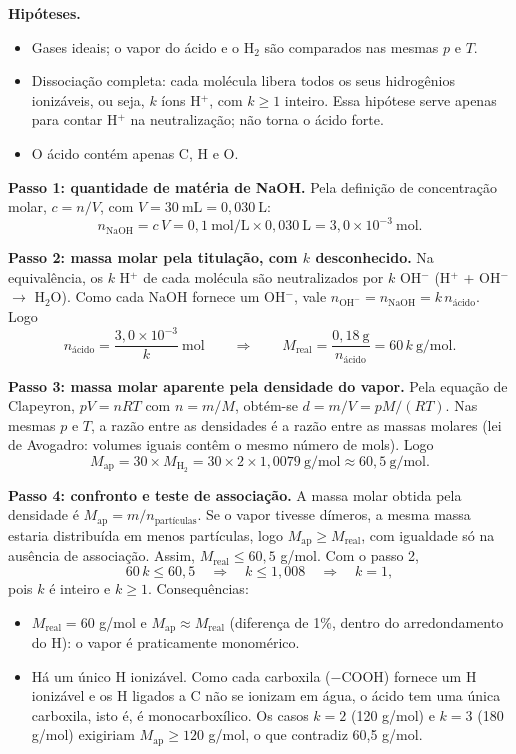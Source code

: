 \documentclass{article}%
\begin{document}
\textbf{Hipóteses.}
\begin{itemize}
\item Gases ideais; o vapor do ácido e o H$_2$ são comparados nas mesmas $p$ e $T$.
\item Dissociação completa: cada molécula libera todos os seus hidrogênios ionizáveis, ou seja, $k$ íons H$^+$, com $k \geq 1$ inteiro. Essa hipótese serve apenas para contar H$^+$ na neutralização; não torna o ácido forte.
\item O ácido contém apenas C, H e O.
\end{itemize}

\textbf{Passo 1: quantidade de matéria de NaOH.} Pela definição de concentração molar, $c = n/V$, com $V = 30\ \text{mL} = 0{,}030\ \text{L}$:
\[
n_{\text{NaOH}} = c\,V = 0{,}1\ \text{mol/L} \times 0{,}030\ \text{L} = 3{,}0 \times 10^{-3}\ \text{mol}.
\]

\textbf{Passo 2: massa molar pela titulação, com $k$ desconhecido.} Na equivalência, os $k$ H$^+$ de cada molécula são neutralizados por $k$ OH$^-$ (H$^+$ + OH$^-$ $\rightarrow$ H$_2$O). Como cada NaOH fornece um OH$^-$, vale $n_{\text{OH}^-} = n_{\text{NaOH}} = k\,n_{\text{ácido}}$. Logo
\[
n_{\text{ácido}} = \frac{3{,}0 \times 10^{-3}}{k}\ \text{mol}
\qquad\Rightarrow\qquad
M_{\text{real}} = \frac{0{,}18\ \text{g}}{n_{\text{ácido}}} = 60\,k\ \text{g/mol}.
\]

\textbf{Passo 3: massa molar aparente pela densidade do vapor.} Pela equação de Clapeyron, $pV = nRT$ com $n = m/M$, obtém-se $d = m/V = pM/(RT)$. Nas mesmas $p$ e $T$, a razão entre as densidades é a razão entre as massas molares (lei de Avogadro: volumes iguais contêm o mesmo número de mols). Logo
\[
M_{\text{ap}} = 30 \times M_{\text{H}_2} = 30 \times 2 \times 1{,}0079\ \text{g/mol} \approx 60{,}5\ \text{g/mol}.
\]

\textbf{Passo 4: confronto e teste de associação.} A massa molar obtida pela densidade é $M_{\text{ap}} = m/n_{\text{partículas}}$. Se o vapor tivesse dímeros, a mesma massa estaria distribuída em menos partículas, logo $M_{\text{ap}} \geq M_{\text{real}}$, com igualdade só na ausência de associação. Assim, $M_{\text{real}} \leq 60{,}5$ g/mol. Com o passo 2,
\[
60\,k \leq 60{,}5 \quad\Rightarrow\quad k \leq 1{,}008 \quad\Rightarrow\quad k = 1,
\]
pois $k$ é inteiro e $k \geq 1$. Consequências:
\begin{itemize}
\item $M_{\text{real}} = 60$ g/mol e $M_{\text{ap}} \approx M_{\text{real}}$ (diferença de 1\%, dentro do arredondamento do H): o vapor é praticamente monomérico.
\item Há um único H ionizável. Como cada carboxila ($-\text{COOH}$) fornece um H ionizável e os H ligados a C não se ionizam em água, o ácido tem uma única carboxila, isto é, é monocarboxílico. Os casos $k = 2$ (120 g/mol) e $k = 3$ (180 g/mol) exigiriam $M_{\text{ap}} \geq 120$ g/mol, o que contradiz 60,5 g/mol.
\end{itemize}
\end{document}
